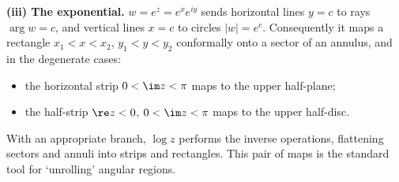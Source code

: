 \textbf{(iii) The exponential.} $w = e^z = e^x e^{iy}$ sends horizontal lines $y = c$ to rays $\arg w = c$, and vertical lines $x = c$ to circles $|w| = e^c$. Consequently it maps a rectangle $x_1 < x < x_2$, $y_1 < y < y_2$ conformally onto a sector of an annulus, and in the degenerate cases:
\begin{itemize}
	\item the horizontal strip $0 < \im z < \pi$ maps to the upper half-plane;
	\item the half-strip $\re z < 0$, $0 < \im z < \pi$ maps to the upper half-disc.
\end{itemize}
\begin{center}
\end{center}
With an appropriate branch, $\log z$ performs the inverse operations, flattening sectors and annuli into strips and rectangles. This pair of maps is the standard tool for `unrolling' angular regions.

